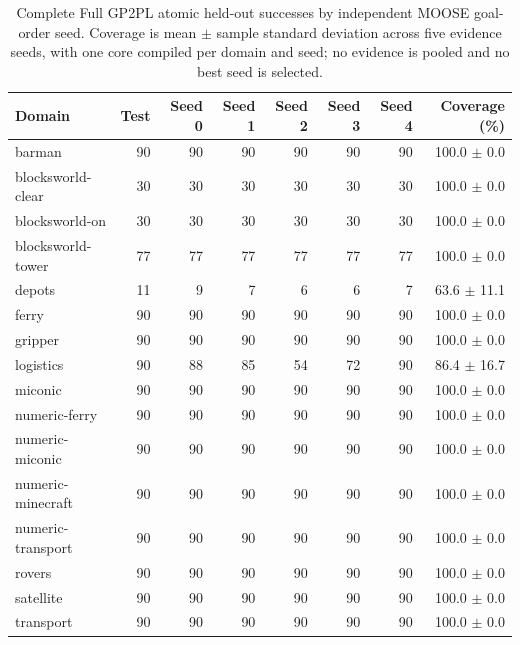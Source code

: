 \begin{table}[htbp]
\centering
\small
\setlength{\tabcolsep}{3pt}
\begin{tabular}{lrrrrrrr}
\toprule
Domain & Test & Seed 0 & Seed 1 & Seed 2 & Seed 3 & Seed 4 & Coverage (\%) \\
\midrule
barman & 90 & 90 & 90 & 90 & 90 & 90 & 100.0 $\pm$ 0.0 \\
blocksworld-clear & 30 & 30 & 30 & 30 & 30 & 30 & 100.0 $\pm$ 0.0 \\
blocksworld-on & 30 & 30 & 30 & 30 & 30 & 30 & 100.0 $\pm$ 0.0 \\
blocksworld-tower & 77 & 77 & 77 & 77 & 77 & 77 & 100.0 $\pm$ 0.0 \\
depots & 11 & 9 & 7 & 6 & 6 & 7 & 63.6 $\pm$ 11.1 \\
ferry & 90 & 90 & 90 & 90 & 90 & 90 & 100.0 $\pm$ 0.0 \\
gripper & 90 & 90 & 90 & 90 & 90 & 90 & 100.0 $\pm$ 0.0 \\
logistics & 90 & 88 & 85 & 54 & 72 & 90 & 86.4 $\pm$ 16.7 \\
miconic & 90 & 90 & 90 & 90 & 90 & 90 & 100.0 $\pm$ 0.0 \\
numeric-ferry & 90 & 90 & 90 & 90 & 90 & 90 & 100.0 $\pm$ 0.0 \\
numeric-miconic & 90 & 90 & 90 & 90 & 90 & 90 & 100.0 $\pm$ 0.0 \\
numeric-minecraft & 90 & 90 & 90 & 90 & 90 & 90 & 100.0 $\pm$ 0.0 \\
numeric-transport & 90 & 90 & 90 & 90 & 90 & 90 & 100.0 $\pm$ 0.0 \\
rovers & 90 & 90 & 90 & 90 & 90 & 90 & 100.0 $\pm$ 0.0 \\
satellite & 90 & 90 & 90 & 90 & 90 & 90 & 100.0 $\pm$ 0.0 \\
transport & 90 & 90 & 90 & 90 & 90 & 90 & 100.0 $\pm$ 0.0 \\
\bottomrule
\end{tabular}
\caption{Complete Full GP2PL atomic held-out successes by independent MOOSE
goal-order seed. Coverage is mean $\pm$ sample standard deviation across five
evidence seeds, with one core compiled per domain and seed; no evidence is
pooled and no best seed is selected.}
\label{tab:five-seed-atomic-domains}
\end{table}


